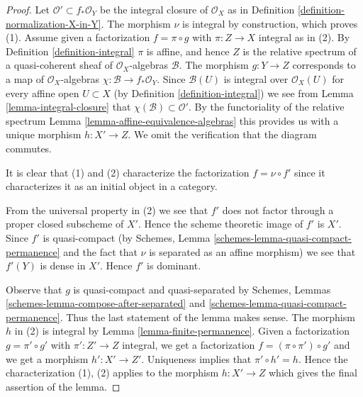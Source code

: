 \documentclass[10pt,a4paper]{amsart}
\theoremstyle{plain}
\theoremstyle{definition}
\theoremstyle{remark}
\numberwithin{equation}{subsection}
\begin{document}
\begin{proof}
Let $\mathcal{O}' \subset f_*\mathcal{O}_Y$ be the integral closure of
$\mathcal{O}_X$ as in Definition \ref{definition-normalization-X-in-Y}.
The morphism $\nu$ is integral by construction, which proves (1).
Assume given a factorization $f = \pi \circ g$ with $\pi : Z \to X$
integral as in (2). By Definition \ref{definition-integral}
$\pi$ is affine, and hence $Z$ is the relative
spectrum of a quasi-coherent sheaf of $\mathcal{O}_X$-algebras $\mathcal{B}$.
The morphism $g : Y \to Z$ corresponds to a map of $\mathcal{O}_X$-algebras
$\chi : \mathcal{B} \to f_*\mathcal{O}_Y$. Since $\mathcal{B}(U)$ is
integral over $\mathcal{O}_X(U)$ for every affine open $U \subset X$
(by Definition \ref{definition-integral})
we see from Lemma \ref{lemma-integral-closure}
that $\chi(\mathcal{B}) \subset \mathcal{O}'$.
By the functoriality of the relative spectrum
Lemma \ref{lemma-affine-equivalence-algebras}
this provides us with a unique morphism
$h : X' \to Z$. We omit the verification that the diagram commutes.

\medskip\noindent
It is clear that (1) and (2) characterize the factorization $f = \nu \circ f'$
since it characterizes it as an initial object in a category.

\medskip\noindent
From the universal property in (2) we see that $f'$ does not factor through
a proper closed subscheme of $X'$. Hence the scheme theoretic image of $f'$
is $X'$. Since $f'$ is quasi-compact (by Schemes, Lemma
\ref{schemes-lemma-quasi-compact-permanence} and the fact that $\nu$ is
separated as an affine morphism) we see that $f'(Y)$ is dense in $X'$.
Hence $f'$ is dominant.

\medskip\noindent
Observe that $g$ is quasi-compact and quasi-separated by
Schemes, Lemmas \ref{schemes-lemma-compose-after-separated} and
\ref{schemes-lemma-quasi-compact-permanence}. Thus the last statement
of the lemma makes sense.
The morphism $h$ in (2) is integral by Lemma \ref{lemma-finite-permanence}.
Given a factorization $g = \pi' \circ g'$ with $\pi' : Z' \to Z$
integral, we get a factorization $f = (\pi \circ \pi') \circ g'$ and
we get a morphism $h' : X' \to Z'$. Uniqueness implies that
$\pi' \circ h' = h$. Hence the characterization (1), (2) applies
to the morphism $h : X' \to Z$ which gives the final assertion of the lemma.
\end{proof}
\end{document}
